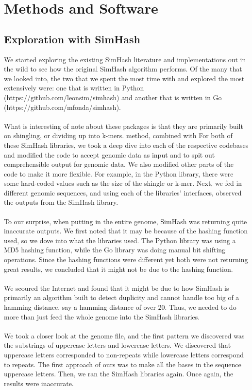 \documentclass[12pt, letterpaper]{article}
\begin{document}
\section*{Methods and Software}
\subsection{Exploration with SimHash}
We started exploring the existing SimHash literature and implementations out in the wild to see how the original SimHash algorithm performs. Of the many that we looked into, the two that we spent the most time with and explored the most extensively were: one that is written in Python (https://github.com/leonsim/simhash) and another that is written in Go (https://github.com/mfonda/simhash). \\ \\
What is interesting of note about these packages is that they are primarily built on shingling, or dividing up into k-mers. method, combined with 
For both of these SimHash libraries, we took a deep dive into each of the respective codebases and modified the code to accept genomic data as input and to spit out comprehensible output for genomic data. We also modified other parts of the code to make it more flexible. For example, in the Python library, there were some hard-coded values such as the size of the shingle or k-mer. Next, we fed in different genomic sequences, and using each of the libraries' interfaces, observed the outputs from the SimHash library. \\ \\
To our surprise, when putting in the entire genome, SimHash was returning quite inaccurate outputs. We first noted that it may be because of the hashing function used, so we dove into what the libraries used. The Python library was using a MD5 hashing function, while the Go library was doing manual bit shifting operations. Since the hashing functions were different yet both were not returning great results, we concluded that it might not be due to the hashing function. \\ \\
We scoured the Internet and found that it might be due to how SimHash is primarily an algorithm built to detect duplicity and cannot handle too big of a hamming distance, say a hamming distance of over 20. Thus, we needed to do more than just feed the whole genome into the SimHash libraries. \\ \\
We took a closer look at the genome file, and the first pattern we discovered was the substrings of uppercase letters and lowercase letters. We discovered that uppercase letters corresponded to non-repeats while lowercase letters correspond to repeats. The first approach of ours was to make all the bases in the sequence uppercase letters. Then, we ran the SimHash libraries again. Once again, the results were inaccurate. \\ \\
\end{document}

